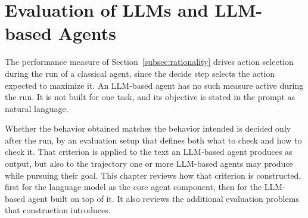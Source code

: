 \chapter{Evaluation of LLMs and LLM-based Agents}
\label{chap:evaluating-agents}

The performance measure of Section~\ref{subsec:rationality} drives action selection during the run of a classical agent, since the decide step selects the action expected to maximize it. An LLM-based agent has no such measure active during the run. It is not built for one task, and its objective is stated in the prompt as natural language.

Whether the behavior obtained matches the behavior intended is decided only after the run, by an evaluation setup that defines both what to check and how to check it. That criterion is applied to the text an LLM-based agent produces as output, but also to the trajectory one or more LLM-based agents may produce while pursuing their goal. This chapter reviews how that criterion is constructed, first for the language model as the core agent component, then for the LLM-based agent built on top of it. It also reviews the additional evaluation problems that construction introduces.












